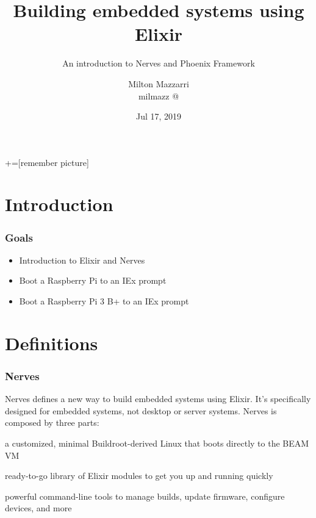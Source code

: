 \documentclass[10pt,xcolor=pdflatex,dvipsnames,table]{beamer}
\title{Building embedded systems using Elixir}
\subtitle{An introduction to Nerves and Phoenix Framework}
\date{Jul 17, 2019}
\author[Milton Mazzarri]{Milton Mazzarri \\
  \alert{milmazz @ \faTwitter \hspace{1pt} \faGithub \hspace{1pt} \faLinkedin}
}
\institute{Houston Functional Programmers Group}
\begin{document}
	+=[remember picture]

	\maketitle

	\section{Introduction}

	\begin{frame}
		\frametitle{Goals}

		\begin{itemize}
      \item Introduction to Elixir and Nerves
			\item Boot a Raspberry Pi to an IEx prompt
			\item Boot a Raspberry Pi 3 B+ to an IEx prompt
		\end{itemize}
	\end{frame}


  \section{Definitions}

  \begin{frame}
    \frametitle{Nerves}

    Nerves defines a new way to build embedded systems using Elixir. It's
    specifically designed for embedded systems, not desktop or server systems.
    Nerves is composed by three parts:

    \begin{description}[<alert@+>]
      \item[Platform] a customized, minimal Buildroot-derived Linux that boots
        directly to the BEAM VM
      \item[Framework] ready-to-go library of Elixir modules to get you up and
        running quickly
      \item[Tooling] powerful command-line tools to manage builds, update
        firmware, configure devices, and more
    \end{description}
  \end{frame}
\end{document}
